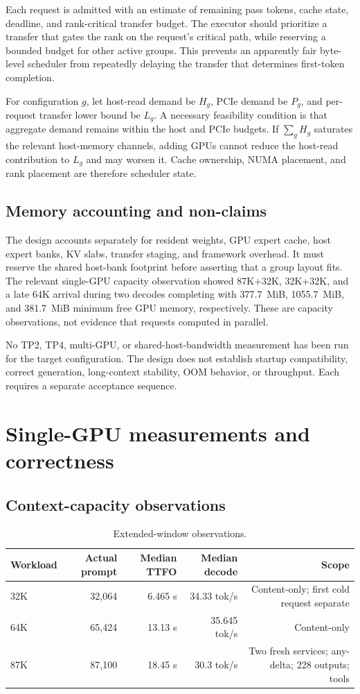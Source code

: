 \documentclass[11pt]{article}
\begin{document}
Each request is admitted with an estimate of remaining pass tokens, cache state, deadline, and rank-critical transfer budget. The executor should prioritize a transfer that gates the rank on the request's critical path, while reserving a bounded budget for other active groups. This prevents an apparently fair byte-level scheduler from repeatedly delaying the transfer that determines first-token completion.

For configuration $g$, let host-read demand be $H_g$, PCIe demand be $P_g$, and per-request transfer lower bound be $L_g$. A necessary feasibility condition is that aggregate demand remains within the host and PCIe budgets. If $\sum_g H_g$ saturates the relevant host-memory channels, adding GPUs cannot reduce the host-read contribution to $L_g$ and may worsen it. Cache ownership, NUMA placement, and rank placement are therefore scheduler state.

\subsection{Memory accounting and non-claims}

The design accounts separately for resident weights, GPU expert cache, host expert banks, KV slabs, transfer staging, and framework overhead. It must reserve the shared host-bank footprint before asserting that a group layout fits. The relevant single-GPU capacity observation showed 87K+32K, 32K+32K, and a late 64K arrival during two decodes completing with 377.7~MiB, 1055.7~MiB, and 381.7~MiB minimum free GPU memory, respectively. These are capacity observations, not evidence that requests computed in parallel.

No TP2, TP4, multi-GPU, or shared-host-bandwidth measurement has been run for the target configuration. The design does not establish startup compatibility, correct generation, long-context stability, OOM behavior, or throughput. Each requires a separate acceptance sequence.

\section{Single-GPU measurements and correctness}

\subsection{Context-capacity observations}

\begin{table}[t]
\centering
\small
\begin{tabular}{lrrrr}
\toprule
Workload & Actual prompt & Median TTFO & Median decode & Scope \\
\midrule
32K & 32,064 & 6.465 s & 34.33 tok/s & Content-only; first cold request separate \\
64K & 65,424 & 13.13 s & 35.645 tok/s & Content-only \\
87K & 87,100 & 18.45 s & 30.3 tok/s & Two fresh services; any-delta; 228 outputs; tools \\
\bottomrule
\end{tabular}
\caption{Extended-window observations.}
\label{tab:capacity}
\end{table}
\end{document}
